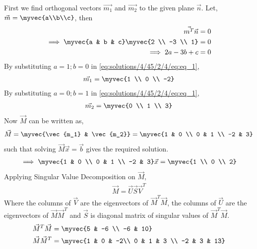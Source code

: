 First we find orthogonal vectors $\vec{m_1}$ and $\vec{m_2}$ to the given plane $\vec{n}$. Let, $\vec{m} = \myvec{a\\b\\c}$, then
\begin{align}
\vec{m^T}\vec{n} &= 0 \nonumber \\
\implies \myvec{a & b & c} \myvec{2 \\ -3 \\ 1} &= 0 \nonumber \\
\implies 2a-3b+c &= 0 \label{eq:solutions/4/45/2/4/eq:eq_1}
\end{align}
By substituting $a=1;b=0$ in \eqref{eq:solutions/4/45/2/4/eq:eq_1},
\begin{align} \label{eq:solutions/4/45/2/4/eq:eq_2}
    \vec{m_1} = \myvec{1 \\ 0 \\ -2} 
\end{align}
By substituting $a=0;b=1$ in \eqref{eq:solutions/4/45/2/4/eq:eq_1},
\begin{align} \label{eq:solutions/4/45/2/4/eq:eq_3}
    \vec{m_2} = \myvec{0 \\ 1 \\ 3} 
\end{align}
Now $\vec{M}$ can be written as,
\begin{align} \label{eq:solutions/4/45/2/4/eq:eq_4}
    \vec{M} = \myvec{\vec{m_1} & \vec{m_2}} = \myvec{1 & 0 \\ 0 & 1 \\ -2 & 3}
\end{align}
such that solving $\vec{M}\vec{x}=\vec{b}$ gives the required solution. 
\begin{align} \label{eq:solutions/4/45/2/4/eq:eq_5}
    \implies \myvec{1 & 0 \\ 0 & 1 \\ -2 & 3}\vec{x} = \myvec{1 \\ 0 \\ 2}
\end{align}
Applying Singular Value Decomposition on $\vec{M}$,
\begin{align} \label{eq:solutions/4/45/2/4/eq:eq_6}
    \vec{M}=\vec{U}\vec{S}\vec{V}^T
\end{align}
Where the columns of $\vec{V}$ are the eigenvectors of $\vec{M}^T\vec{M}$, the columns of $\vec{U}$ are the eigenvectors of $\vec{M}\vec{M}^T$ and $\vec{S}$ is diagonal matrix of singular values of $\vec{M}^T\vec{M}$.
\begin{align}
    \vec{M}^T \vec{M} &= \myvec{5 & -6 \\ -6 & 10}\label{eq:solutions/4/45/2/4/eq:eq_7} \\
    \vec{M} \vec{M}^T &= \myvec{1 & 0 & -2\\ 0 & 1 & 3 \\ -2 & 3 & 13} \label{eq:solutions/4/45/2/4/eq:eq_8}
\end{align}
